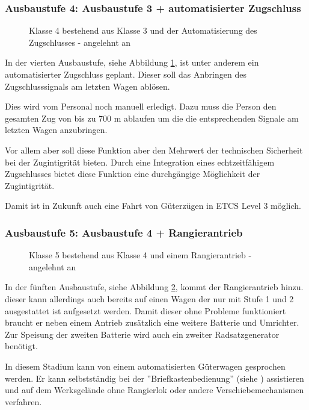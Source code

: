 \subsubsection{Ausbaustufe 4: Ausbaustufe 3 + automatisierter Zugschluss}
\begin{figure}[htbp] 
    
    \caption{Klasse 4 bestehend aus Klasse 3 und der Automatisierung des Zugschlusses - angelehnt an \cite{ETR_3}}
    \label{fig:Klasse4}
\end{figure} 
In der vierten Ausbaustufe, siehe Abbildung \ref{fig:Klasse4}, ist unter anderem ein automatisierter Zugschluss geplant. Dieser soll das Anbringen des Zugschlusssignals am letzten Wagen ablösen.\par
Dies wird vom Personal noch manuell erledigt. Dazu muss die Person den gesamten Zug von bis zu 700 m ablaufen um die die entsprechenden Signale am letzten Wagen anzubringen.\par
Vor allem aber soll diese Funktion aber den Mehrwert der technischen Sicherheit bei der Zugintigrität bieten. Durch eine Integration eines echtzeitfähigem Zugschlusses bietet diese Funktion eine durchgängige Möglichkeit der Zugintigrität.\par
Damit ist in Zukunft auch eine Fahrt von Güterzügen in ETCS Level 3 möglich.

\subsubsection{Ausbaustufe 5: Ausbaustufe 4 + Rangierantrieb} \label{sec:A5}
\begin{figure}[htbp] 
    
    \caption{Klasse 5 bestehend aus Klasse 4 und einem Rangierantrieb - angelehnt an \cite{ETR_3}}
    \label{fig:Klasse5}
\end{figure}
In der fünften Ausbaustufe, siehe Abbildung \ref{fig:Klasse5}, kommt der Rangierantrieb hinzu. dieser kann allerdings auch bereits auf einen Wagen der nur mit Stufe 1 und 2 ausgestattet ist aufgesetzt werden. Damit dieser ohne Probleme funktioniert braucht er neben einem Antrieb zusätzlich eine weitere Batterie und Umrichter. Zur Speisung der zweiten Batterie wird auch ein zweiter Radsatzgenerator benötigt.\par
In diesem Stadium kann von einem automatisierten Güterwagen gesprochen werden. Er kann selbstständig bei der ''Briefkastenbedienung'' (siehe \cite{GAK}) assistieren und auf dem Werksgelände ohne Rangierlok oder andere Verschiebemechanismen verfahren.


